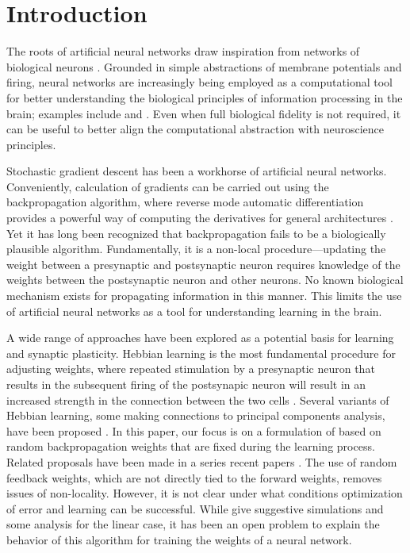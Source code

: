 \section{Introduction}

The roots of artificial neural networks draw inspiration from networks of biological neurons \citep{pdp,elman,medler}. Grounded in simple abstractions of membrane potentials and firing, neural networks are increasingly being employed as a computational tool for better understanding the biological principles of information processing in the brain; examples include \cite{ilker1} and \cite{yamins2}. Even when full biological fidelity is not required, it can be useful to better align the computational abstraction with neuroscience principles.

Stochastic gradient descent has been a workhorse of artificial neural networks. Conveniently, calculation of gradients can be carried out using the backpropagation algorithm, where reverse mode automatic differentiation provides a powerful way of computing the derivatives for general architectures \citep{rumelhart:86}.
Yet it has long been recognized that backpropagation fails to be a biologically plausible algorithm. Fundamentally, it is a non-local procedure---updating the weight between a presynaptic and postsynaptic neuron requires knowledge of the weights between the postsynaptic neuron and other neurons. No known biological mechanism exists for propagating information in this manner. This limits the use of artificial neural networks as a tool for understanding learning in the brain.

A wide range of approaches have been explored as a potential basis for learning and synaptic plasticity. Hebbian learning is the most fundamental procedure for adjusting weights, where
repeated stimulation by a presynaptic neuron that results in the subsequent
firing of the postsynapic neuron will result in an increased strength in the connection
between the two cells \citep{hebb1,paulsen}. Several variants of Hebbian learning, some making connections to principal components analysis, have been proposed
\citep{oja,sejnowski1,sejnowski2}. In this paper, our focus is on a formulation of \cite{lillicrap2016random} based on random
backpropagation weights that are fixed during the learning process.
Related proposals have been made in a series recent papers \citep{akrout,bellec,lillicrap2020backpropagation}.
The use of random feedback weights, which are not directly tied to the forward weights, removes issues of non-locality. However, it is not clear under what conditions optimization of error and learning can be successful. While \citet{lillicrap2016random} give suggestive simulations and some analysis for the linear case, it has been an open problem to explain the behavior of this algorithm for training the weights of a neural network.

